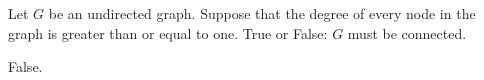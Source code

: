 \begin{prob}
    Let $G$ be an undirected graph. Suppose that the degree of every node in the graph
    is greater than or equal to one. True or False: $G$ must be connected.

    \tF{}

    \begin{soln}
        False.
    \end{soln}

\end{prob}

